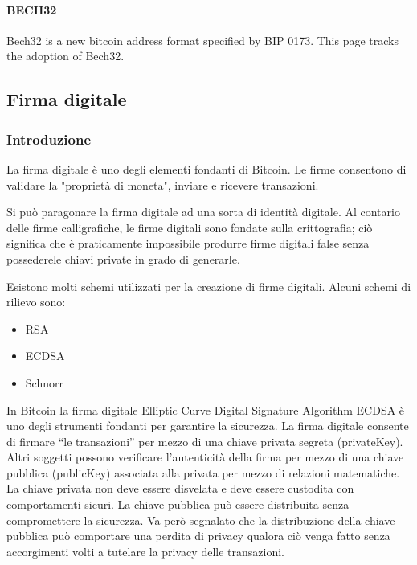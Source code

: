 \documentclass{book}
\theoremstyle{definition}
\begin{document}
\paragraph{BECH32}

Bech32 is a new bitcoin address format specified by BIP 0173. This page tracks the adoption of Bech32.

\newpage
\subsection{Firma digitale}

\subsubsection{Introduzione}

La firma digitale è uno degli elementi fondanti di Bitcoin. Le firme consentono di validare la "proprietà di moneta", inviare
e ricevere transazioni.

Si può paragonare la firma digitale ad una sorta di identità digitale. Al contario delle firme calligrafiche, le firme digitali
sono fondate sulla crittografia; ciò significa che è praticamente impossibile produrre firme digitali false senza possederele chiavi private 
in grado di generarle.

Esistono molti schemi utilizzati per la creazione di firme digitali. Alcuni schemi di rilievo sono:

\begin{itemize}
    \item RSA
    \item ECDSA
    \item Schnorr
\end{itemize}

In Bitcoin la firma digitale Elliptic Curve Digital Signature Algorithm ECDSA è uno degli strumenti fondanti per garantire la sicurezza.
La firma digitale consente di firmare “le transazioni” per mezzo di una chiave privata segreta (privateKey). Altri soggetti possono verificare l’autenticità della firma per mezzo di una chiave pubblica (publicKey) associata alla privata per mezzo di relazioni matematiche.
La chiave privata non deve essere disvelata e deve essere custodita con comportamenti sicuri.
La chiave pubblica può essere distribuita senza compromettere la sicurezza. Va però segnalato che la distribuzione della chiave pubblica può comportare una perdita di privacy qualora ciò venga fatto senza accorgimenti volti a tutelare la privacy delle transazioni.
\end{document}
